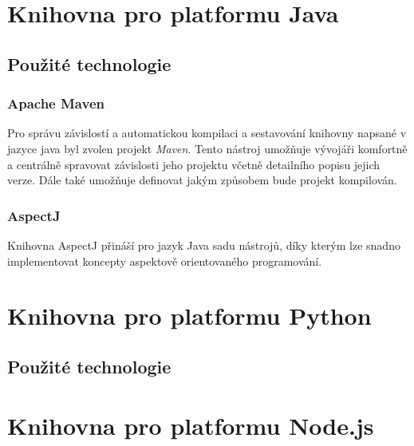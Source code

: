 

\section{Knihovna pro platformu Java}

\subsection{Použité technologie}

\subsubsection{Apache Maven}

Pro správu závislostí a automatickou kompilaci a sestavování
knihovny napsané v jazyce java byl zvolen projekt \textit{Maven}. %
Tento nástroj umožňuje vývojáři komfortně a centrálně
spravovat závislosti jeho projektu včetně detailního
popisu jejich verze. Dále také umožňuje definovat jakým
způsobem bude projekt kompilován.

\subsubsection{AspectJ}

Knihovna AspectJ přináší pro jazyk Java sadu nástrojů,
díky kterým lze snadno implementovat koncepty aspektově orientovaného
programování.


\section{Knihovna pro platformu Python}

\subsection{Použité technologie}

\subsection{}

\section{Knihovna pro platformu Node.js}


